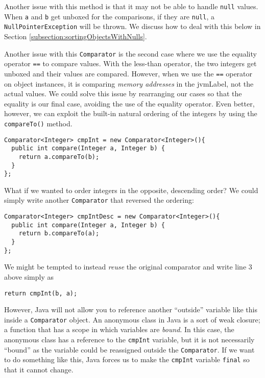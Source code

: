 Another issue with this method is that it may not be able to handle 
\texttt{null} values.  When \texttt{a} and \texttt{b}
get unboxed for the comparisons, if they are \texttt{null}, 
a \texttt{NullPointerException} will be thrown.  We discuss
how to deal with this below in Section \ref{subsection:sortingObjectsWithNulls}.

Another issue with this \texttt{Comparator} is the second
case where we use the equality operator \texttt{==} to compare
values.  With the less-than operator, the two integers get unboxed and
their values are compared.  However, when we use the \texttt{==}
operator on object instances, it is comparing \emph{memory addresses} in
the \gls{jvmLabel}, not the actual values.  We could solve this issue by
rearranging our cases so that the equality is our final case, avoiding the
use of the equality operator.  Even better, however, we can exploit the
built-in natural ordering of the integers by using the \texttt{compareTo()}
method.

\begin{verbatim}
Comparator<Integer> cmpInt = new Comparator<Integer>(){
  public int compare(Integer a, Integer b) {
    return a.compareTo(b);
  }
};
\end{verbatim}

What if we wanted to order integers in the opposite, descending order?  
We could simply write another \texttt{Comparator} that reversed
the ordering:

\begin{verbatim}
Comparator<Integer> cmpIntDesc = new Comparator<Integer>(){
  public int compare(Integer a, Integer b) {
    return b.compareTo(a);
  }
};
\end{verbatim}

We might be tempted to instead \emph{reuse} the original comparator and
write line 3 above simply as 

\texttt{return cmpInt(b, a);}

However, Java will not allow you to reference another ``outside'' variable
like this inside a \texttt{Comparator} object.  An anonymous
class in Java is a sort of weak \gls{closure}; a function that has a scope
in which variables are \emph{bound}.  In this case, the anonymous class
has a reference to the \texttt{cmpInt} variable, but it is
not necessarily ``bound'' as the variable could be reassigned outside
the \texttt{Comparator}.  If we want to do something like this, 
Java forces us to make the \texttt{cmpInt} variable 
\texttt{final} so that it cannot change.

